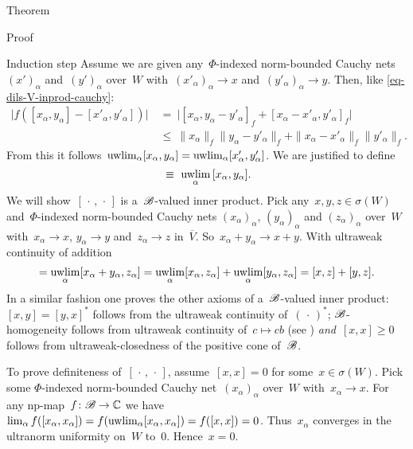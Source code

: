 \begin{parsec}
\begin{point}{Theorem}
\begin{point}{Proof}
\begin{point}{Induction step}
Assume we are given any~$\Phi$-indexed
norm-bounded Cauchy nets~$(x')_\alpha$ and~$(y')_\alpha$ over~$W$
with~$ (x'_\alpha)_\alpha \to x$
and~$ (y'_\alpha)_\alpha \to y$.
Then, like \eqref{eq-dils-V-inprod-cauchy}:
\begin{align*}
    \bigl|f([x_\alpha, y_\alpha] - [x'_\alpha,y'_\alpha])\bigr|
    & \ =\  \bigl| [x_\alpha, y_\alpha - y'_\alpha]_f
        + [x_\alpha - x'_\alpha, y'_\alpha]_f\bigr| \\
    &\  \leq\  \|x_\alpha\|_f \|y_\alpha - y'_\alpha\|_f
        + \|x_\alpha - x'_\alpha\|_f \| y'_\alpha \|_f.
\end{align*}
From this it follows~$ \uwlim_\alpha [x_\alpha,y_\alpha]=
    \uwlim_\alpha [x'_\alpha,y'_\alpha]$.
We are justified to define
\begin{equation*}
    [x,y] \ \equiv\  \uwlim_{\alpha} \,[x_\alpha,y_\alpha].
\end{equation*}
We will show~$[\,\cdot\,,\,\cdot\,]$ is a~$\mathscr{B}$-valued inner product.
Pick any~$x,y,z \in \sigma(W)$
    and~$\Phi$-indexed
norm-bounded Cauchy nets
$(x_\alpha)_\alpha$, $(y_\alpha)_\alpha$ and $(z_\alpha)_\alpha$ over~$W$
with~$x_\alpha \to x$, $y_\alpha \to y$ and~$z_\alpha \to z$ in~$\overline{V}$.
So~$x_\alpha+ y_\alpha \to x + y.$
With ultraweak continuity of addition
\begin{equation*}
    [x+y,z] = \uwlim_\alpha [x_\alpha +y_\alpha, z_\alpha]
        = \uwlim_\alpha [x_\alpha, z_\alpha] +
                \uwlim_\alpha [y_\alpha, z_\alpha]
                = [x,z] + [y,z].
\end{equation*}
In a similar fashion one proves the other axioms of
    a~$\mathscr{B}$-valued inner product:
    $[x,y]=[y,x]^*$ follows from the ultraweak continuity of~$(\,\cdot\,)^*$;
    $\mathscr{B}$-homogeneity follows from
        ultraweak continuity of~$c \mapsto cb$ (see )
        \emph{and}~$[x,x]\geq 0$ follows from ultraweak-closedness of the
        positive cone of~$\mathscr{B}$.

        To prove definiteness of~$[\,\cdot\,,\,\cdot\,]$, assume~$[x,x]=0$
            for some~$x \in \sigma(W)$.
    Pick some $\Phi$-indexed norm-bounded
        Cauchy net~$(x_\alpha)_\alpha$ over~$W$
        with~$x_\alpha \to x$.
For any np-map~$f\colon \mathscr{B} \to \mathbb{C}$
we have~$\lim_\alpha f([x_\alpha,x_\alpha])
         = f(\uwlim_\alpha [x_\alpha,x_\alpha])
         = f([x,x])  =  0$.
Thus~$x_\alpha$ converges in the ultranorm uniformity on~$W$ to~$0$.
Hence~$x=0$.


\end{point}
\end{point}
\end{point}
\end{parsec}
